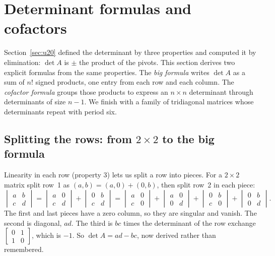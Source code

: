 \section{Determinant formulas and cofactors}\label{sec:u21}

Section~\ref{sec:u20} defined the determinant by three properties and computed it by
elimination: $\det A$ is $\pm$ the product of the pivots. This section derives two explicit
formulas from the same properties. The \emph{big formula} writes $\det A$ as a sum of $n!$
signed products, one entry from each row and each column. The \emph{cofactor formula} groups
those products to express an $n\times n$ determinant through determinants of size $n-1$. We
finish with a family of tridiagonal matrices whose determinants repeat with period six.

\subsection{Splitting the rows: from \texorpdfstring{$2\times 2$}{2 by 2} to the big formula}

Linearity in each row (property 3) lets us split a row into pieces. For a $2\times 2$ matrix
split row~1 as $(a,b)=(a,0)+(0,b)$, then split row~2 in each piece:
\[
  \begin{vmatrix}a&b\\c&d\end{vmatrix}
  =\begin{vmatrix}a&0\\c&d\end{vmatrix}+\begin{vmatrix}0&b\\c&d\end{vmatrix}
  =\begin{vmatrix}a&0\\c&0\end{vmatrix}+\begin{vmatrix}a&0\\0&d\end{vmatrix}
  +\begin{vmatrix}0&b\\c&0\end{vmatrix}+\begin{vmatrix}0&b\\0&d\end{vmatrix}.
\]
The first and last pieces have a zero column, so they are singular and vanish. The second is
diagonal, $ad$. The third is $bc$ times the determinant of the row exchange
$\left[\begin{smallmatrix}0&1\\1&0\end{smallmatrix}\right]$, which is $-1$. So
$\det A=ad-bc$, now derived rather than remembered.

